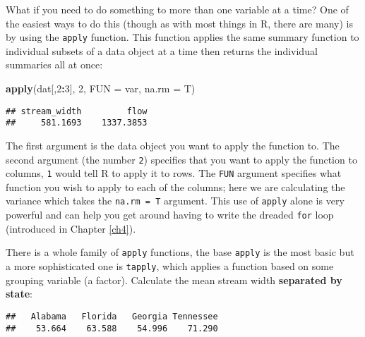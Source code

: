 \documentclass[]{book}
\newenvironment{Shaded}{\begin{snugshade}}{\end{snugshade}}
\newcommand{\KeywordTok}[1]{\textcolor[rgb]{0.13,0.29,0.53}{\textbf{#1}}}
\newcommand{\DataTypeTok}[1]{\textcolor[rgb]{0.13,0.29,0.53}{#1}}
\newcommand{\DecValTok}[1]{\textcolor[rgb]{0.00,0.00,0.81}{#1}}
\newcommand{\OperatorTok}[1]{\textcolor[rgb]{0.81,0.36,0.00}{\textbf{#1}}}
\newcommand{\NormalTok}[1]{#1}
\theoremstyle{definition}
\theoremstyle{definition}
\theoremstyle{definition}
\theoremstyle{remark}
\begin{document}
What if you need to do something to more than one variable at a time?
One of the easiest ways to do this (though as with most things in R,
there are many) is by using the \texttt{apply} function. This function
applies the same summary function to individual subsets of a data object
at a time then returns the individual summaries all at once:

\begin{Shaded}
\begin{Highlighting}[]
\KeywordTok{apply}\NormalTok{(dat[,}\DecValTok{2}\OperatorTok{:}\DecValTok{3}\NormalTok{], }\DecValTok{2}\NormalTok{, }\DataTypeTok{FUN =}\NormalTok{ var, }\DataTypeTok{na.rm =}\NormalTok{ T)}
\end{Highlighting}
\end{Shaded}

\begin{verbatim}
## stream_width         flow 
##     581.1693    1337.3853
\end{verbatim}

The first argument is the data object you want to apply the function to.
The second argument (the number \texttt{2}) specifies that you want to
apply the function to columns, \texttt{1} would tell R to apply it to
rows. The \texttt{FUN} argument specifies what function you wish to
apply to each of the columns; here we are calculating the variance which
takes the \texttt{na.rm\ =\ T} argument. This use of \texttt{apply}
alone is very powerful and can help you get around having to write the
dreaded \texttt{for} loop (introduced in Chapter \ref{ch4}).

There is a whole family of \texttt{apply} functions, the base
\texttt{apply} is the most basic but a more sophisticated one is
\texttt{tapply}, which applies a function based on some grouping
variable (a factor). Calculate the mean stream width \textbf{separated
by state}:

\begin{Shaded}
\end{Shaded}

\begin{verbatim}
##   Alabama   Florida   Georgia Tennessee 
##    53.664    63.588    54.996    71.290
\end{verbatim}
\end{document}
